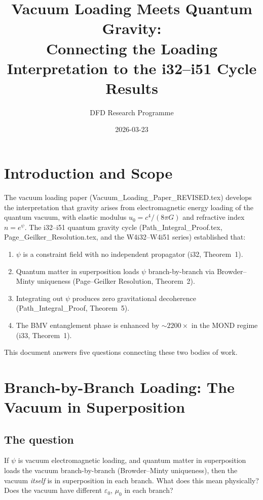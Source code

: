 \documentclass[11pt,a4paper]{article}
\title{Vacuum Loading Meets Quantum Gravity:\\
Connecting the Loading Interpretation to the i32--i51 Cycle Results}
\author{DFD Research Programme}
\date{2026-03-23}
\begin{document}
\maketitle
\tableofcontents
\newpage


\section{Introduction and Scope}
\label{sec:intro}

The vacuum loading paper (Vacuum\_Loading\_Paper\_REVISED.tex) develops the
interpretation that gravity arises from electromagnetic energy loading of the
quantum vacuum, with elastic modulus $u_0 = c^4/(8\pi G)$ and refractive
index $n = e^\psi$.  The i32--i51 quantum gravity cycle
(Path\_Integral\_Proof.tex, Page\_Geilker\_Resolution.tex, and the
W4i32--W4i51 series) established that:
\begin{enumerate}
\item $\psi$ is a constraint field with no independent propagator (i32, Theorem~1).
\item Quantum matter in superposition loads $\psi$ branch-by-branch via
Browder--Minty uniqueness (Page--Geilker Resolution, Theorem~2).
\item Integrating out $\psi$ produces zero gravitational decoherence
(Path\_Integral\_Proof, Theorem~5).
\item The BMV entanglement phase is enhanced by $\sim 2200\times$ in the MOND
regime (i33, Theorem~1).
\end{enumerate}

This document answers five questions connecting these two bodies of work.


\section{Branch-by-Branch Loading: The Vacuum in Superposition}
\label{sec:branch-loading}

\subsection{The question}

If $\psi$ is vacuum electromagnetic loading, and quantum matter in
superposition loads the vacuum branch-by-branch (Browder--Minty uniqueness),
then the vacuum \emph{itself} is in superposition in each branch.  What does
this mean physically?  Does the vacuum have different $\varepsilon_0$, $\mu_0$
in each branch?
\end{document}
